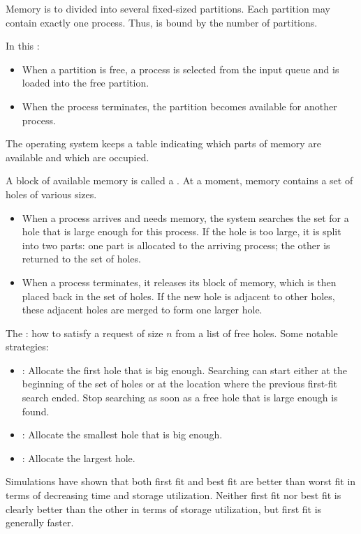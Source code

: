     \par Memory is to divided into several fixed-sized partitions. Each partition may contain exactly one process. Thus,  is bound by the number of partitions.
    \par In this :
    \begin{itemize}
      \item When a partition is free, a process is selected from the input queue and is loaded into the free partition.
      \item When the process terminates, the partition becomes available for another process.
    \end{itemize}

      \par The operating system keeps a table indicating which parts of memory are available and which are occupied.
      \par A block of available memory is called a . At a moment, memory contains a set of holes of various sizes.
      \begin{itemize}
        \item  When a process arrives and needs memory, the system searches the set for a hole that is large enough for this process. If the hole is too large, it is split into two parts: one part is allocated to the arriving process; the other is returned to the set of holes. 
        \item When a process terminates, it releases its block of memory, which is then placed back in the set of holes. If the new hole is adjacent to other holes, these adjacent holes are merged to form one larger hole.
      \end{itemize}
      \par The : how to satisfy a request of size $n$ from a list of free holes. Some notable strategies:
      \begin{itemize}
        \item {}: Allocate the first hole that is big enough. Searching can start either at the beginning of the set of holes or at the location where the previous first-fit search ended. Stop searching as soon as a free hole that is large enough is found.
        \item {}: Allocate the smallest hole that is big enough.
        \item {}: Allocate the largest hole.
      \end{itemize}
      \par Simulations have shown that both first fit and best fit are better than worst fit in terms of decreasing time and storage utilization. Neither first fit nor best fit is clearly better than the other in terms of storage utilization, but first fit is generally faster.

